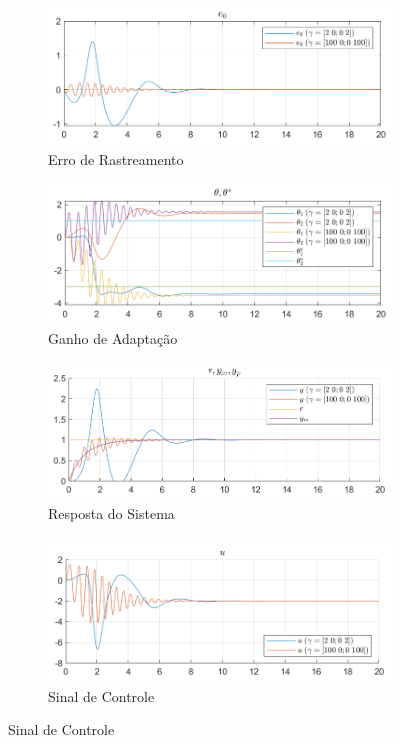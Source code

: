 \documentclass[10pt]{article}
\begin{document}
\begin{figure}[h!]
    \centering
    \begin{subfigure}[b]{0.35\textwidth}
        \centering
        \includegraphics[width=\textwidth]{img/fig01a.png}
        \caption{Erro de Rastreamento}
    \end{subfigure}
    \begin{subfigure}[b]{0.35\textwidth}
        \centering
        \includegraphics[width=\textwidth]{img/fig01b.png}
        \caption{Ganho de Adaptação}
    \end{subfigure}

    \begin{subfigure}[b]{0.35\textwidth}
        \centering
        \includegraphics[width=\textwidth]{img/fig01c.png}
        \caption{Resposta do Sistema}
    \end{subfigure}
    \begin{subfigure}[b]{0.35\textwidth}
        \centering
        \includegraphics[width=\textwidth]{img/fig01e.png}
        \caption{Sinal de Controle}
    \end{subfigure}


\end{figure}
\end{document}
